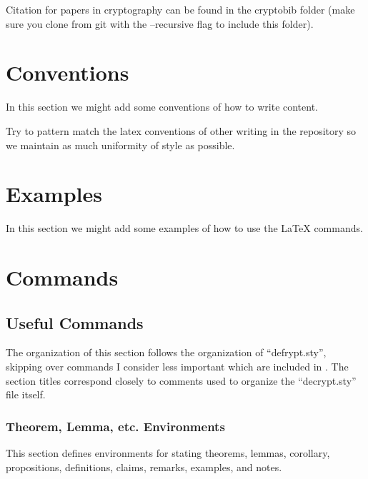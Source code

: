 \documentclass[11pt,twoside]{report}
\begin{document}
Citation for papers in cryptography can be found in the cryptobib folder (make sure you clone from git with the --recursive flag to include this folder).



\chapter{Conventions}
In this section we might add some conventions of how to write content.

Try to pattern match the latex conventions of other writing in the repository so we maintain as much uniformity of style as possible.



\chapter{Examples}
In this section we might add some examples of how to use the LaTeX commands.






\chapter{Commands}

\section{Useful Commands}
The organization of this section follows the organization of ``defrypt.sty'', skipping over commands I consider less important which are included in .
The section titles correspond closely to comments used to organize the ``decrypt.sty'' file itself.

\subsection{Theorem, Lemma, etc. Environments}
This section defines environments for stating theorems, lemmas, corollary, propositions, definitions, claims, remarks, examples, and notes.
\end{document}
